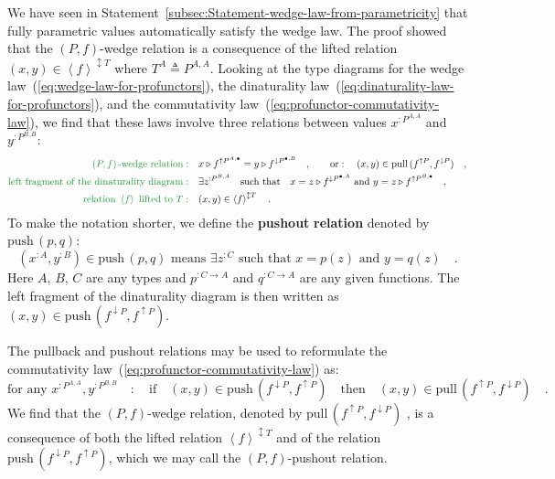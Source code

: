 We have seen in Statement~\ref{subsec:Statement-wedge-law-from-parametricity}
that fully parametric values automatically satisfy the wedge law.
The proof showed that the $\left(P,f\right)$-wedge relation is a
consequence of the lifted relation $(x,y)\in\left<f\right>^{\updownarrow T}$
where $T^{A}\triangleq P^{A,A}$. Looking at the type diagrams for
the wedge law~(\ref{eq:wedge-law-for-profunctors}), the dinaturality
law~(\ref{eq:dinaturality-law-for-profunctors}), and the commutativity
law~(\ref{eq:profunctor-commutativity-law}), we find that these
laws involve three relations between values $x^{:P^{A,A}}$ and $y^{:P^{B,B}}$:
\begin{align*}
{\color{greenunder}\left(P,f\right)\text{-wedge relation}:}\quad & x\triangleright f^{\uparrow P^{A,\bullet}}=y\triangleright f^{\downarrow P^{\bullet,B}}\quad,\quad\quad\text{or}:\quad(x,y)\in\text{pull}\,(f^{\uparrow P},f^{\downarrow P})\quad,\\
{\color{greenunder}\text{left fragment of the dinaturality diagram}:}\quad & \exists z^{:P^{B,A}}\quad\text{such that}\quad x=z\triangleright f^{\downarrow P^{\bullet,A}}\text{ and }y=z\triangleright f^{\uparrow P^{B,\bullet}}\quad,\\
{\color{greenunder}\text{relation }\left<f\right>\text{ lifted to }T:}\quad & (x,y)\in\left<f\right>^{\updownarrow T}\quad.
\end{align*}
To make the notation shorter, we define the \textbf{pushout} \textbf{relation}
denoted by $\text{push}\,(p,q)$:
\[
(x^{:A},y^{:B})\in\text{push}\,(p,q)\text{ means }\exists z^{:C}\text{ such that }x=p(z)\text{ and }y=q(z)\quad.
\]
Here $A$, $B$, $C$ are any types and $p^{:C\rightarrow A}$ and
$q^{:C\rightarrow A}$ are any given functions. The left fragment
of the dinaturality diagram is then written as $(x,y)\in\text{push}\,(f^{\downarrow P},f^{\uparrow P})$.

The pullback and pushout relations may be used to reformulate the
commutativity law~(\ref{eq:profunctor-commutativity-law}) as: 
\[
\text{for any }x^{:P^{A,A}},y^{:P^{B,B}}\quad:\quad\text{if}\quad(x,y)\in\text{push}\,(f^{\downarrow P},f^{\uparrow P})\quad\text{then}\quad(x,y)\in\text{pull}\,(f^{\uparrow P},f^{\downarrow P})\quad.
\]
We find that the $\left(P,f\right)$-wedge relation, denoted by $\text{pull}\,(f^{\uparrow P},f^{\downarrow P})$
, is a consequence of both the lifted relation $\left<f\right>^{\updownarrow T}$
and of the relation $\text{push}\,(f^{\downarrow P},f^{\uparrow P})$,
which we may call the $\left(P,f\right)$-pushout relation.


